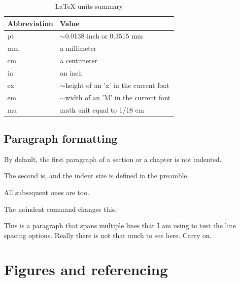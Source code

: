 \documentclass[12pt, letterpaper]{article} %
\begin{document}
\begin{table}[!h]
	\centering
	\begin{tabular}{|l|l|}
		\hline
		Abbreviation & Value                                      \\ \hline
		pt           & $\sim$0.0138 inch or 0.3515 mm             \\ \hline
		mm           & a millimeter                               \\ \hline
		cm           & a centimeter                               \\ \hline
		in           & an inch                                    \\ \hline
		ex           & $\sim$height of an 'x' in the current font \\ \hline
		em           & $\sim$width of an 'M' in the current font  \\ \hline
		mu           & math unit equal to 1/18 em                 \\ \hline
	\end{tabular}
	\caption{LaTeX units summary}
	\label{table:units}
\end{table}

\subsection*{Paragraph formatting}

By default, the first paragraph of a section or a chapter is not indented.

The second is, and the indent size is defined in the preamble.

All subsequent ones are too.

\noindent The noindent command changes this.\par

This is a paragraph that spans multiple lines that I am using to test the line spacing options. Really there is not that much to see here. Carry on.

\clearpage
\section{Figures and referencing} \label{sec:fig} %
\end{document}
